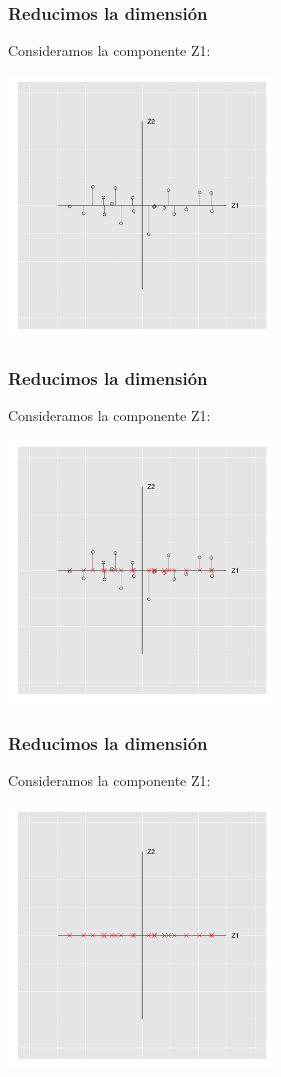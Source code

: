 \documentclass{beamer}
\begin{document}
  \begin{frame}\frametitle{Reducimos la dimensión}
  Consideramos la componente Z1:
 \begin{center}
   \includegraphics[height=7cm]{reduccion2d1d_1.png}
 \end{center}
  \end{frame}
  \begin{frame}\frametitle{Reducimos la dimensión}
  Consideramos la componente Z1:
 \begin{center}
   \includegraphics[height=7cm]{reduccion2d1d_2.png}
 \end{center}
  \end{frame}
  \begin{frame}\frametitle{Reducimos la dimensión}
  Consideramos la componente Z1:
 \begin{center}
   \includegraphics[height=7cm]{reduccion2d1d_3.png}
 \end{center}
  \end{frame}
\end{document}
